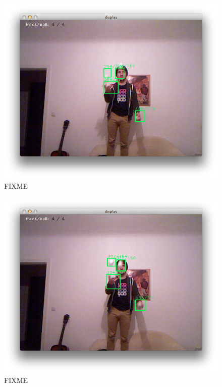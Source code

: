 \documentclass[12pt,a4paper,ngerman]{scrartcl}
\begin{document}
\begin{figure}[H]
    \centering
    \includegraphics[scale=0.5]{img/rects-3.png}
    \vspace{-0.5cm}
    \caption{FIXME}
    \label{rects-3}
\end{figure}

\begin{figure}[H]
    \centering
    \includegraphics[scale=0.5]{img/rects-4.png}
    \vspace{-0.5cm}
    \caption{FIXME}
    \label{rects-4}
\end{figure}
\end{document}

